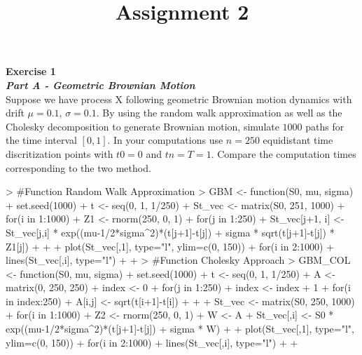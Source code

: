 \documentclass{article}
\title{Assignment 2}
\date{\vspace{-5ex}}
\begin{document}


\textbf{Exercise 1} \\

\textbf{\textit{Part A - Geometric Brownian Motion}} \\

Suppose we have process X following geometric Brownian motion dynamics with drift $\mu = 0.1$, $\sigma = 0.1$. By using the random walk approximation as well as the Cholesky decomposition to generate Brownian motion, simulate $1000$ paths for the time interval $[0,1]$. In your computations use $n = 250$ equidistant time discritization points with $t0 = 0$ and $tn = T = 1$. Compare the computation times
corresponding to the two method. 

\begin{Schunk}
\begin{Sinput}
> #Function Random Walk Approximation
> GBM <- function(S0, mu, sigma){
+   set.seed(1000)
+   t <- seq(0, 1, 1/250)
+   St_vec <- matrix(S0, 251, 1000)
+   for(i in 1:1000){
+     Z1 <- rnorm(250, 0, 1)
+     for(j in 1:250){
+       St_vec[j+1, i] <- St_vec[j,i] * exp((mu-1/2*sigma^2)*(t[j+1]-t[j]) + sigma * sqrt(t[j+1]-t[j]) * Z1[j])
+     }
+   }
+   plot(St_vec[,1], type="l", ylim=c(0, 150))
+   for(i in 2:1000){
+     lines(St_vec[,i], type="l")
+   }
+ }
> #Function Cholesky Approach
> GBM_COL <- function(S0, mu, sigma){
+   set.seed(1000)
+   t <- seq(0, 1, 1/250)
+   A <- matrix(0, 250, 250)
+   index <- 0
+   for(j in 1:250){
+     index <- index + 1
+     for(i in index:250){
+       A[i,j] <- sqrt(t[i+1]-t[i])
+     }
+   }
+   St_vec <- matrix(S0, 250, 1000)
+   for(i in 1:1000){
+     Z2 <- rnorm(250, 0, 1)
+     W <- A %
+     St_vec[,i] <- S0 * exp((mu-1/2*sigma^2)*(t[j+1]-t[j]) + sigma * W)
+   }
+   plot(St_vec[,1], type="l", ylim=c(0, 150))
+   for(i in 2:1000){
+     lines(St_vec[,i], type="l")
+   }
+ }
\end{Sinput}
\end{Schunk}
\end{document}
